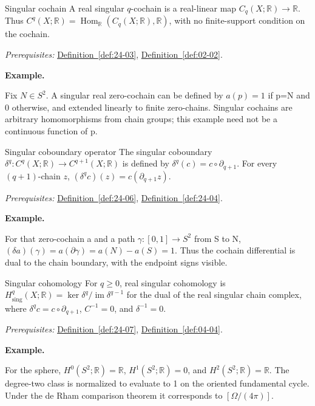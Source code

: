 \documentclass[11pt]{article}
\makeatletter
\newcommand{\R}{\mathbb R}
\newcounter{definition}
\newcommand{\exampleheading}{\par\medskip\textbf{Example.}\par\smallskip}
\newcommand{\currentdefinition}[1]{\protected@edef\@currentlabel{#1}}
\makeatother
\begin{document}
\begin{definitionbox}{Singular cochain}
\currentdefinition{\thedefinition}
\label{def:24-06}
A real singular $q$-cochain is a real-linear map $C_q(X;\R)\to\R$. Thus $C^q(X;\R)=\operatorname{Hom}_{\R}(C_q(X;\R),\R)$, with no finite-support condition on the cochain.

\smallskip
\textit{Prerequisites:} \hyperref[def:24-03]{Definition~\ref*{def:24-03}}, \hyperref[def:02-02]{Definition~\ref*{def:02-02}}.

\exampleheading
Fix $N\in S^2$. A singular real zero-cochain can be defined by $a(p)=1$ if p=N and 0 otherwise, and extended linearly to finite zero-chains. Singular cochains are arbitrary homomorphisms from chain groups; this example need not be a continuous function of p.
\end{definitionbox}

\begin{definitionbox}{Singular coboundary operator}
\currentdefinition{\thedefinition}
\label{def:24-07}
The singular coboundary $\delta^q:C^q(X;\R)\to C^{q+1}(X;\R)$ is defined by $\delta^q(c)=c\circ\partial_{q+1}$. For every $(q+1)$-chain $z$, $(\delta^qc)(z)=c(\partial_{q+1}z)$.

\smallskip
\textit{Prerequisites:} \hyperref[def:24-06]{Definition~\ref*{def:24-06}}, \hyperref[def:24-04]{Definition~\ref*{def:24-04}}.

\exampleheading
For that zero-cochain a and a path $\gamma:[0,1]\to S^2$ from S to N, $(\delta a)(\gamma)=a(\partial\gamma)=a(N)-a(S)=1$. Thus the cochain differential is dual to the chain boundary, with the endpoint signs visible.
\end{definitionbox}

\begin{definitionbox}{Singular cohomology}
\currentdefinition{\thedefinition}
\label{def:24-08}
For $q\ge0$, real singular cohomology is $H^q_{\mathrm{sing}}(X;\R)=\ker\delta^q/\operatorname{im}\delta^{q-1}$ for the dual of the real singular chain complex, where $\delta^qc=c\circ\partial_{q+1}$, $C^{-1}=0$, and $\delta^{-1}=0$.

\smallskip
\textit{Prerequisites:} \hyperref[def:24-07]{Definition~\ref*{def:24-07}}, \hyperref[def:04-04]{Definition~\ref*{def:04-04}}.

\exampleheading
For the sphere, $H^0(S^2;\R)=\R$, $H^1(S^2;\R)=0$, and $H^2(S^2;\R)=\R$. The degree-two class is normalized to evaluate to 1 on the oriented fundamental cycle. Under the de Rham comparison theorem it corresponds to $[\Omega/(4\pi)]$.
\end{definitionbox}
\end{document}
